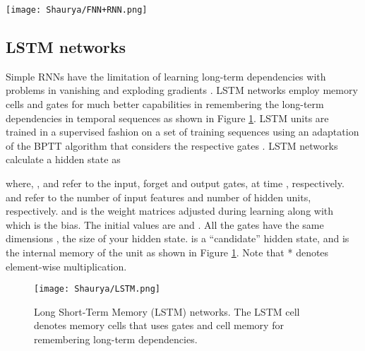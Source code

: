 \documentclass{ieeeaccess}
\begin{document}
 

 \begin{figure*}[tb]
  \begin{center}  
   \texttt{[image: Shaurya/FNN+RNN.png]} \\
   
   \label{fig:FNNRNN}
    \caption{ Feedforward neural network and Elman recurrent neural network for time series prediction. }
\end{center}
\end{figure*}


 \subsection{LSTM  networks}
 
 Simple RNNs have the \cite{hochreiter1997long} limitation of learning long-term dependencies with problems in vanishing and exploding gradients  \cite{hochreiter1998vanishing}. LSTM networks employ  memory cells and gates for much better capabilities in remembering the   long-term dependencies   in temporal sequences   as shown in Figure \ref{fig:LSTM}. LSTM units are trained in a supervised fashion on a set of training sequences  using an adaptation of the BPTT algorithm that considers the respective gates \cite{hochreiter1997long}.   LSTM networks calculate a hidden state   as
 

 where,  ,  and  refer to the input, forget and output gates, at time , respectively.   and   refer to the number of input features and number of hidden units, respectively.    and  is the weight matrices adjusted during learning along with   which is the bias.   The initial values are  and   . All the gates have the same dimensions , the size of your hidden state.  is a “candidate” hidden state, and   is the internal memory of the unit as shown in Figure \ref{fig:LSTM}.  Note that *  denotes element-wise multiplication.


 
\begin{figure}[htbp!]
  \begin{center}  
   \texttt{[image: Shaurya/LSTM.png]} 
    \caption{ Long Short-Term Memory (LSTM)   networks. The LSTM cell denotes  memory cells that uses gates and cell memory for remembering long-term dependencies. 
}
 \label{fig:LSTM}
  \end{center}
\end{figure}



 
 
\end{document}
